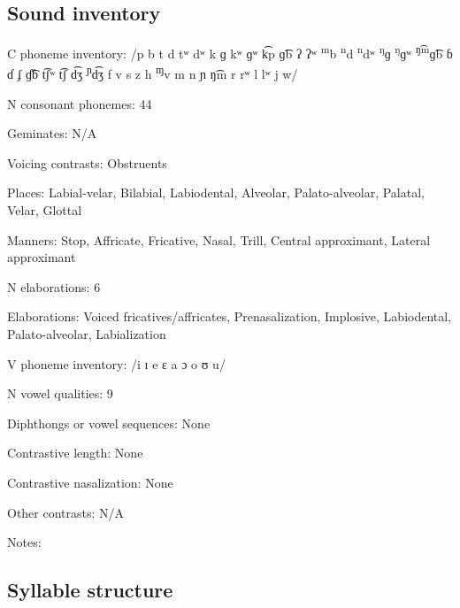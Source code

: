 {\subsection*{Sound inventory}
\begin{appendixdesc}

\item[C phoneme inventory:] /p b t d tʷ dʷ k ɡ kʷ ɡʷ k͡p ɡ͡b ʔ ʔʷ \textsuperscript{m}b \textsuperscript{n}d \textsuperscript{n}dʷ \textsuperscript{ŋ}ɡ \textsuperscript{ŋ}ɡʷ \textsuperscript{ŋ͡m}ɡ͡b ɓ ɗ ʄ ɠ͡ɓ t͡ʃʷ t͡ʃ d͡ʒ \textsuperscript{ɲ}d͡ʒ f v s z h \textsuperscript{ɱ}v m n ɲ ŋ͡m r rʷ l lʷ j w/

\item[N consonant phonemes:] 44

\item[Geminates:] N/A

\item[Voicing contrasts:] Obstruents

\item[Places:] Labial-velar, Bilabial, Labiodental, Alveolar, Palato-alveolar, Palatal, Velar, Glottal

\item[Manners:] Stop, Affricate, Fricative, Nasal, Trill, Central approximant, Lateral approximant

\item[N elaborations:] 6

\item[Elaborations:] Voiced fricatives/affricates, Prenasalization, Implosive, Labiodental, Palato-alveolar, Labialization

\item[V phoneme inventory:] /i ɪ e ɛ a ɔ o ʊ u/

\item[N vowel qualities:] 9

\item[Diphthongs or vowel sequences:] None

\item[Contrastive length:] None

\item[Contrastive nasalization:] None

\item[Other contrasts:] N/A

\item[Notes:]
\end{appendixdesc}
\subsection*{Syllable structure}
\begin{appendixdesc}


\end{appendixdesc}}
